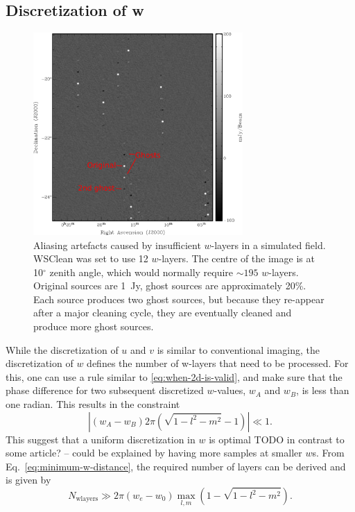 \documentclass[useAMS,usenatbib]{mn2e}
\newcommand{\degree}{\ensuremath{^{\circ}}\xspace}
\begin{document}
\subsection{Discretization of w} \label{sec:gridding-w}
\begin{figure}
\begin{center}
\includegraphics[width=8cm]{img/aliasing-example-annotated}
\caption{Aliasing artefacts caused by insufficient $w$-layers in a simulated field. WSClean was set to use 12 $w$-layers. The centre of the image is at 10\degree zenith angle, which would normally require $\sim195$ $w$-layers. Original sources are 1~Jy, ghost sources are approximately 20\%. Each source produces two ghost sources, but because they re-appear after a major cleaning cycle, they are eventually cleaned and produce more ghost sources. }
\label{fig:aliasing-example}
\end{center}
\end{figure}
While the discretization of $u$ and $v$ is similar to conventional imaging, the discretization of $w$ defines the number of w-layers that need to be processed. For this, one can use a rule similar to \eqref{eq:when-2d-is-valid}, and make sure that the phase difference for two subsequent discretized $w$-values, $w_A$ and $w_B$,  is less than one radian. This results in the constraint
\begin{equation} \label{eq:minimum-w-distance}
\left|\left(w_A - w_B\right) 2\pi (\sqrt{1-l^2-m^2}-1)\right| \ll 1.
\end{equation}
This suggest that a uniform discretization in $w$ is optimal TODO in contrast to some article? -- could be explained by having more samples at smaller $w$s. From Eq.~\eqref{eq:minimum-w-distance}, the required number of layers can be derived and is given by
\begin{equation} \label{eq:nwlayers-bound}
 N_\textrm{wlayers} \gg 2\pi \left(w_e - w_0\right) \max_{l,m} \left(1 - \sqrt{1-l^2-m^2}\right).
\end{equation}
\end{document}
